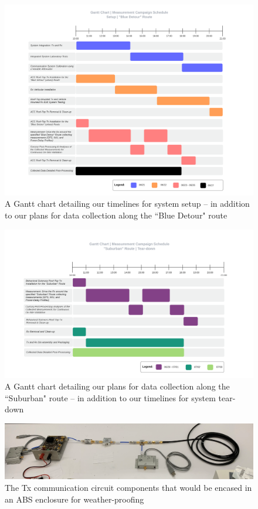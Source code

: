 \documentclass[12pt]{article}
\newcommand{\areaofinterestfigwidth}{1.0\textwidth}
\begin{document}
    \begin{figure}
        \centering
        \includegraphics[width=\areaofinterestfigwidth]{figs/Odin_Measurement_Campaign_Schedule_Urban.png}
        \caption{A Gantt chart detailing our timelines for system setup -- in addition to our plans for data collection along the ``Blue Detour" route}
        \label{fig:gantt-urban}
    \end{figure}
    \begin{figure}
        \centering
        \includegraphics[width=\areaofinterestfigwidth]{figs/Odin_Measurement_Schedule_Suburban.png}
        \caption{A Gantt chart detailing our plans for data collection along the ``Suburban" route -- in addition to our timelines for system tear-down}
        \label{fig:gantt-suburban}
    \end{figure}
    \begin{figure}
        \centering
        \includegraphics[width=\areaofinterestfigwidth]{figs/Tx_MiniCircuits.png}
        \caption{The Tx communication circuit components that would be encased in an ABS enclosure for weather-proofing}
        \label{fig:Tx-mini}
    \end{figure}
\end{document}
